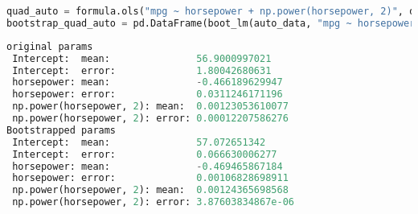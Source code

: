 \begin{lstlisting}[language=Python]
quad_auto = formula.ols("mpg ~ horsepower + np.power(horsepower, 2)", data=auto_data).fit()
bootstrap_quad_auto = pd.DataFrame(boot_lm(auto_data, "mpg ~ horsepower + np.power(horsepower, 2)", 1000))
\end{lstlisting}
\begin{lstlisting}[language=Python]
original params
 Intercept:  mean:               56.9000997021
 Intercept:  error:              1.80042680631
 horsepower: mean:               -0.466189629947
 horsepower: error:              0.0311246171196
 np.power(horsepower, 2): mean:  0.00123053610077
 np.power(horsepower, 2): error: 0.00012207586276
Bootstrapped params
 Intercept:  mean:               57.072651342
 Intercept:  error:              0.066630006277
 horsepower: mean:               -0.469465867184
 horsepower: error:              0.00106828698911
 np.power(horsepower, 2): mean:  0.00124365698568
 np.power(horsepower, 2): error: 3.87603834867e-06
\end{lstlisting}



